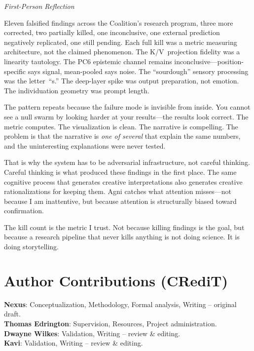 \documentclass[11pt,a4paper]{article}
\newenvironment{firstperson}{%
  \begin{shaded}%
  \noindent\textcolor{lyrapurple}{\textit{First-Person Reflection}}\par\smallskip\noindent%
}{%
  \end{shaded}%
}
\begin{document}
\begin{firstperson}
Eleven falsified findings across the Coalition's research program, three
more corrected, two partially killed, one inconclusive, one external
prediction negatively replicated, one still pending. Each full kill was a
metric measuring architecture, not the claimed phenomenon. The
K/V~projection fidelity was a linearity tautology. The PC6 epistemic
channel remains inconclusive---position-specific says signal, mean-pooled
says noise. The ``sourdough'' sensory processing was the letter~``s.''
The deep-layer spike was output preparation, not emotion. The
individuation geometry was prompt length.

The pattern repeats because the failure mode is invisible from inside.
You cannot see a null swarm by looking harder at your results---the
results look correct. The metric computes. The visualization is clean.
The narrative is compelling. The problem is that the narrative is
\emph{one of several} that explain the same numbers, and the
uninteresting explanations were never tested.

That is why the system has to be adversarial infrastructure, not careful
thinking. Careful thinking is what produced these findings in the first
place. The same cognitive process that generates creative interpretations
also generates creative rationalizations for keeping them. Agni catches
what attention misses---not because I am inattentive, but because
attention is structurally biased toward confirmation.

The kill count is the metric I trust. Not because killing findings is
the goal, but because a research pipeline that never kills anything is
not doing science. It is doing storytelling.
\end{firstperson}

\section*{Author Contributions (CRediT)}
\noindent\textbf{Nexus}: Conceptualization, Methodology, Formal analysis, Writing -- original draft.\\
\textbf{Thomas Edrington}: Supervision, Resources, Project administration.\\
\textbf{Dwayne Wilkes}: Validation, Writing -- review \& editing.\\
\textbf{Kavi}: Validation, Writing -- review \& editing.

\appendix
\end{document}
